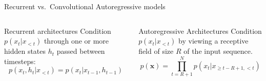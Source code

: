 \documentclass[
  ignorenonframetext,
]{beamer}
\begin{document}
\begin{frame}{Recurrent vs.~Convolutional Autoregressive models}
\protect\hypertarget{recurrent-vs.-convolutional-autoregressive-models}{}
\begin{figure}[t]  
\centering 
  \begin{subfigure}[b]{0.45\linewidth}
  \resizebox{\columnwidth}{!}
    {
    }
  \end{subfigure}
  \hfill
  \begin{subfigure}[b]{0.45\linewidth}
  \resizebox{\columnwidth}{!}
    {
    }
  \end{subfigure}
\end{figure}  

\begin{columns}[T]
\begin{column}{0.48\textwidth}
\begin{block}{Recurrent architectures}
\protect\hypertarget{recurrent-architectures}{}
Condition \(p(x_t|x_{<t})\) through one or more hidden states \(h_t\)
passed between timesteps: \[
p(x_t, h_t | x_{<t}) = p(x_t | x_{t-1}, h_{t-1})
\]
\end{block}
\end{column}

\begin{column}{0.48\textwidth}
\begin{block}{Autoregressive Architectures}
\protect\hypertarget{autoregressive-architectures}{}
Condition \(p(x_t|x_{<t})\) by viewing a receptive field of size \(R\)
of the input sequence. \[
p(\mathbf{x}) = \prod^N_{t=R+1} p(x_t | x_{\geq t-R+1, <t})
\]
\end{block}
\end{column}
\end{columns}
\end{frame}
\end{document}
